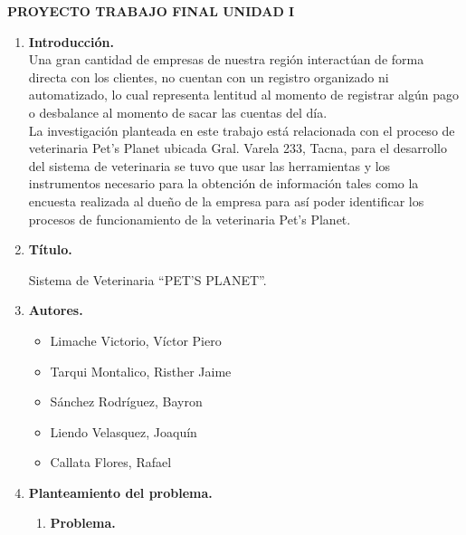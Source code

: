 \documentclass[12pt,a4paper,oneside]{book}
\begin{document}
	\newpage
	
	\begin{center} 
		\LARGE{\bf PROYECTO TRABAJO FINAL \newline UNIDAD I }\\ \vspace{.25cm}
	\end{center}

	
	\begin{enumerate}
		
		\item \textbf{Introducci\'on.} \\
		
				Una gran cantidad de empresas de nuestra región interactúan de forma directa con los clientes, no cuentan con un registro organizado ni automatizado, lo cual representa lentitud al momento de registrar algún pago o desbalance al momento de sacar las cuentas del d\'ia. \\
				
				La investigaci\'on planteada en este trabajo est\'a relacionada con el proceso de veterinaria Pet’s Planet ubicada Gral. Varela 233, Tacna, para el desarrollo del sistema de veterinaria se tuvo que usar las herramientas y los instrumentos necesario para la obtención de información tales como la encuesta realizada al dueño de la empresa para así poder identificar los procesos de funcionamiento de la veterinaria Pet’s Planet.\\
		
		
		\item \textbf{T\'itulo.}
		
				Sistema de Veterinaria “PET’S PLANET”.	
				
		\item \textbf{Autores.}
		
				\begin{itemize}
					
					\item	Limache Victorio, V\'ictor Piero 
					\item	Tarqui Montalico, Risther Jaime 
					\item	S\'anchez Rodr\'iguez, Bayron 
					\item	Liendo Velasquez, Joaqu\'in 
					\item	Callata Flores, Rafael 
					
				\end{itemize}
			
		\item \textbf{Planteamiento del problema.}
				\begin{enumerate}
					\item \textbf{Problema.} \\
					

\end{enumerate}
\end{enumerate}
\end{document}

